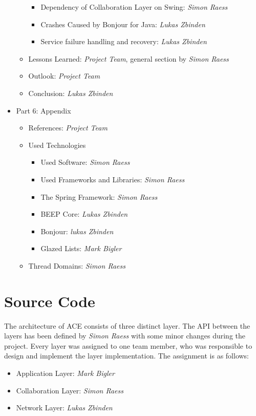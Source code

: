 \begin{itemize}
\begin{itemize}
\begin{itemize}
   \item Dependency of Collaboration Layer on Swing: \emph{Simon Raess}
   \item Crashes Caused by Bonjour for Java: \emph{Lukas Zbinden}
   \item Service failure handling and recovery: \emph{Lukas Zbinden}
  \end{itemize}
  \item Lessons Learned: \emph{Project Team}, general section by \emph{Simon Raess}
  \item Outlook: \emph{Project Team}
  \item Conclusion: \emph{Lukas Zbinden}
 \end{itemize}
 \item Part 6: Appendix
 \begin{itemize}
  \item References: \emph{Project Team}
  \item Used Technologies
  \begin{itemize}
   \item Used Software: \emph{Simon Raess}
   \item Used Frameworks and Libraries: \emph{Simon Raess}
   \item The Spring Framework: \emph{Simon Raess}
   \item BEEP Core: \emph{Lukas Zbinden}
   \item Bonjour: \emph{lukas Zbinden}
   \item Glazed Lists: \emph{Mark Bigler}
  \end{itemize}
  \item Thread Domains: \emph{Simon Raess}
 \end{itemize}
\end{itemize}



\section{Source Code}
The architecture of ACE consists of three distinct layer. The 
API between the layers has been defined by \emph{Simon Raess} with some 
minor changes during the project. Every layer
was assigned to one team member, who was responsible to design and implement
the layer implementation. The assignment is as follows:

\begin{itemize}
 \item Application Layer: \emph{Mark Bigler}
 \item Collaboration Layer: \emph{Simon Raess}
 \item Network Layer: \emph{Lukas Zbinden}
\end{itemize}

